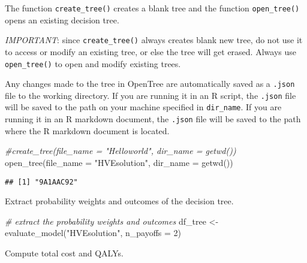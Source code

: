 \documentclass[
]{article}
\newenvironment{Shaded}{\begin{snugshade}}{\end{snugshade}}
\newcommand{\AttributeTok}[1]{\textcolor[rgb]{0.77,0.63,0.00}{#1}}
\newcommand{\CommentTok}[1]{\textcolor[rgb]{0.56,0.35,0.01}{\textit{#1}}}
\newcommand{\DecValTok}[1]{\textcolor[rgb]{0.00,0.00,0.81}{#1}}
\newcommand{\FunctionTok}[1]{\textcolor[rgb]{0.00,0.00,0.00}{#1}}
\newcommand{\NormalTok}[1]{#1}
\newcommand{\OtherTok}[1]{\textcolor[rgb]{0.56,0.35,0.01}{#1}}
\newcommand{\StringTok}[1]{\textcolor[rgb]{0.31,0.60,0.02}{#1}}
\begin{document}
The function \texttt{create\_tree()} creates a blank tree and the
function \texttt{open\_tree()} opens an existing decision tree.

\emph{IMPORTANT}: since \texttt{create\_tree()} always creates blank new
tree, do not use it to access or modify an existing tree, or else the
tree will get erased. Always use \texttt{open\_tree()} to open and
modify existing trees.

Any changes made to the tree in OpenTree are automatically saved as a
\texttt{.json} file to the working directory. If you are running it in
an R script, the \texttt{.json} file will be saved to the path on your
machine specified in \texttt{dir\_name}. If you are running it in an R
markdown document, the \texttt{.json} file will be saved to the path
where the R markdown document is located.

\begin{Shaded}
\begin{Highlighting}[]
\CommentTok{\#create\_tree(file\_name = "Helloworld", dir\_name = getwd())}
\FunctionTok{open\_tree}\NormalTok{(}\AttributeTok{file\_name =} \StringTok{"HVEsolution"}\NormalTok{, }\AttributeTok{dir\_name =} \FunctionTok{getwd}\NormalTok{())}
\end{Highlighting}
\end{Shaded}

\begin{verbatim}
## [1] "9A1AAC92"
\end{verbatim}

Extract probability weights and outcomes of the decision tree.

\begin{Shaded}
\begin{Highlighting}[]
\CommentTok{\# extract the probability weights and outcomes  }
\NormalTok{df\_tree }\OtherTok{\textless{}{-}} \FunctionTok{evaluate\_model}\NormalTok{(}\StringTok{"HVEsolution"}\NormalTok{, }\AttributeTok{n\_payoffs =} \DecValTok{2}\NormalTok{)}
\end{Highlighting}
\end{Shaded}

Compute total cost and QALYs.
\end{document}
